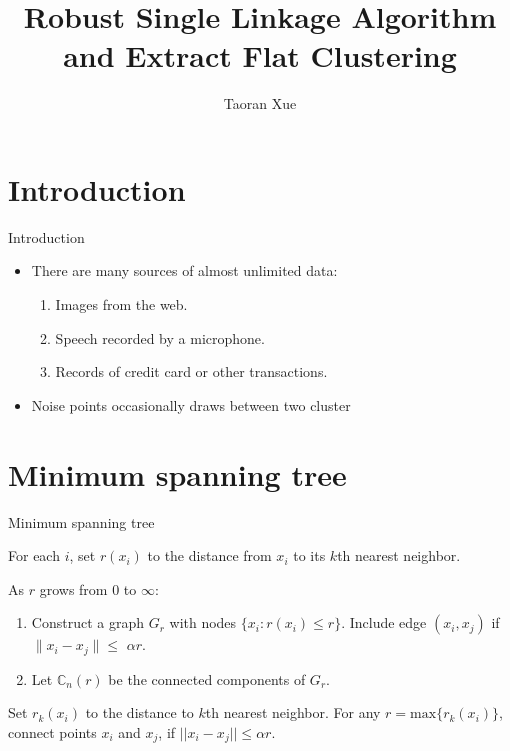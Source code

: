 \documentclass{beamer}
\title{Robust Single Linkage Algorithm and Extract Flat Clustering}
\author{Taoran Xue}
\institute{George Washington University}
\begin{document}
\begin{frame}
  \titlepage
\end{frame}



\section{Introduction}

\begin{frame}{Introduction}
\begin{itemize}
	\item There are many sources of almost unlimited data:
	\begin{enumerate}
		\item Images from the web.
		\item Speech recorded by a microphone.
		\item Records of credit card or other transactions.
	\end{enumerate}
	\item Noise points occasionally draws between two cluster
\end{itemize}

\end{frame}

\section{Minimum spanning tree}

\begin{frame}{Minimum spanning tree}

\begin{tcolorbox}
	For each $i$, set $r(x_i)$ to the distance from $x_i$ to its {\color{red}$k$}th nearest neighbor.
	
	As $r$ grows from $0$ to $\infty$:
	\begin{enumerate}
		\item Construct a graph $G_r$ with nodes $\{x_i : r(x_i) \leq r\}$. Include edge $(x_i, x_j)$ if $\|x_i - x_j\| \leq$ {\color{red}$\alpha r$}.
		\item Let $\mathbb{C}_n(r)$ be the connected components of $G_r$.
	\end{enumerate}  
	
\end{tcolorbox}


\begin{definition}
	Set $r_k(x_i)$ to the distance to $k$th nearest neighbor. For any $r = \text{max}\{r_k(x_i)\}$, connect points $x_i$ and $x_j$, if $||x_i - x_j|| \leq \alpha r$.
\end{definition}

\end{frame}
\end{document}
